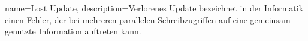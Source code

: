 {
  name=Lost Update,
  description={Verlorenes Update bezeichnet in der Informatik einen Fehler, der bei mehreren parallelen Schreibzugriffen auf eine gemeinsam genutzte Information auftreten kann.}
}